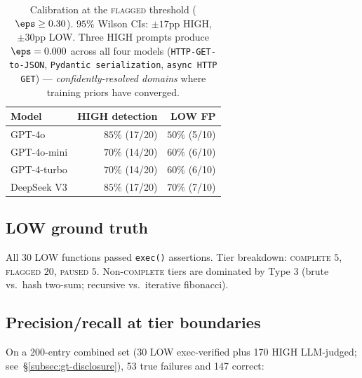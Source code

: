 \begin{table}[h]
\centering
\small
\begin{tabular}{lrr}
\toprule
Model & HIGH detection & LOW FP \\
\midrule
GPT-4o         & $85\%$ (17/20) & $50\%$ (5/10) \\
GPT-4o-mini    & $70\%$ (14/20) & $60\%$ (6/10) \\
GPT-4-turbo    & $70\%$ (14/20) & $60\%$ (6/10) \\
DeepSeek V3    & $85\%$ (17/20) & $70\%$ (7/10) \\
\bottomrule
\end{tabular}
\caption{Calibration at the \textsc{flagged} threshold ($\eps \ge
0.30$). $95\%$ Wilson CIs: $\pm 17$pp HIGH, $\pm 30$pp LOW. Three
HIGH prompts produce $\eps = 0.000$ across all four models
(\texttt{HTTP-GET-to-JSON}, \texttt{Pydantic serialization},
\texttt{async HTTP GET}) --- \emph{confidently-resolved domains} where
training priors have converged.}
\label{tab:calibration}
\end{table}

\subsection{LOW ground truth}
\label{subsec:low-gt}

All 30 LOW functions passed \texttt{exec()} assertions. Tier
breakdown: \textsc{complete} $5$, \textsc{flagged} $20$,
\textsc{paused} $5$. Non-\textsc{complete} tiers are dominated by
Type 3 (brute vs.\ hash two-sum; recursive vs.\ iterative
fibonacci).

\subsection{Precision/recall at tier boundaries}
\label{subsec:pr}

On a 200-entry combined set (30 LOW exec-verified plus 170 HIGH
LLM-judged; see~\S\ref{subsec:gt-disclosure}), 53 true failures and
147 correct:

